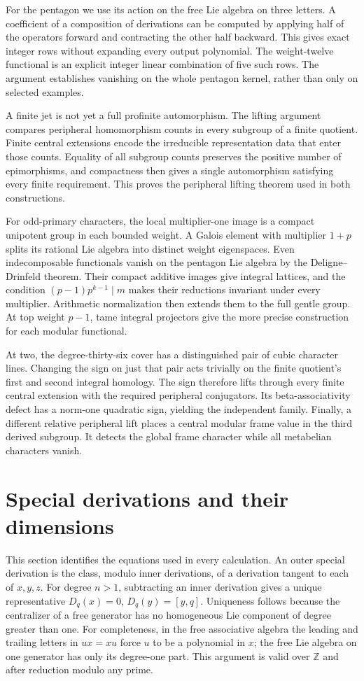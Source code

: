 \documentclass[11pt]{article}
\newcommand{\Z}{\mathbb Z}
\theoremstyle{definition}
\theoremstyle{remark}
\begin{document}
For the pentagon we use its action on the free Lie algebra on three
letters.  A coefficient of a composition of derivations can be computed
by applying half of the operators forward and contracting the other half
backward.  This gives exact integer rows without expanding every output
polynomial.  The weight-twelve functional is an explicit integer linear
combination of five such rows.  The argument establishes vanishing on
the whole pentagon kernel, rather than only on selected examples.

A finite jet is not yet a full profinite automorphism. The lifting
argument compares peripheral homomorphism counts in every subgroup of
a finite quotient. Finite central extensions encode the irreducible
representation data that enter those counts. Equality of all subgroup
counts preserves the positive number of epimorphisms, and compactness
then gives a single automorphism satisfying every finite requirement.
This proves the peripheral lifting theorem used in both constructions.

For odd-primary characters, the local multiplier-one image is a compact
unipotent group in each bounded weight. A Galois element with multiplier
$1+p$ splits its rational Lie algebra into distinct weight eigenspaces.
Even indecomposable functionals vanish on the pentagon Lie algebra by
the Deligne--Drinfeld theorem. Their compact additive images give integral
lattices, and the condition $(p-1)p^{k-1}\mid m$ makes their reductions
invariant under every multiplier. Arithmetic normalization then extends
them to the full gentle group. At top weight $p-1$, tame integral
projectors give the more precise construction for each modular functional.

At two, the degree-thirty-six cover has a distinguished pair of cubic
character lines. Changing the sign on just that pair acts trivially
on the finite quotient's first and second integral homology. The sign
therefore lifts through every finite central extension with the required
peripheral conjugators. Its beta-associativity defect has a norm-one
quadratic sign, yielding the independent family. Finally, a different
relative peripheral lift places a central modular frame value in the
third derived subgroup. It detects the global frame character while
all metabelian characters vanish.

\section{Special derivations and their dimensions}\label{sec:dimensions}
This section identifies the equations used in every calculation.
An outer special derivation is the class, modulo inner derivations, of a
derivation tangent to each of $x,y,z$.  For degree $n>1$, subtracting an
inner derivation gives a unique representative $D_q(x)=0$,
$D_q(y)=[y,q]$.  Uniqueness follows because the centralizer of a free
generator has no homogeneous Lie component of degree greater than one.
For completeness, in the free associative algebra the leading and trailing
letters in $ux=xu$ force $u$ to be a polynomial in $x$; the free Lie algebra
on one generator has only its degree-one part.  This argument is valid
over $\Z$ and after reduction modulo any prime.
\end{document}
